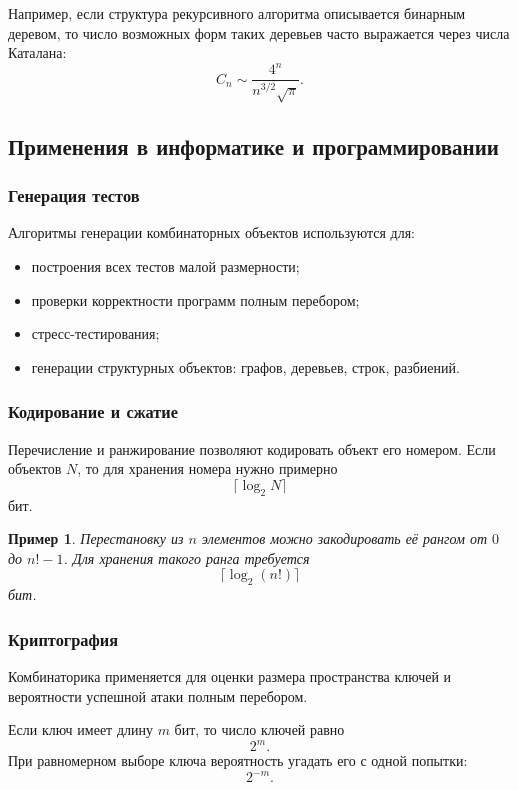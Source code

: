 \documentclass[12pt,a4paper]{article}
\newtheorem{example}{Пример}
\begin{document}
Например, если структура рекурсивного алгоритма описывается бинарным деревом, то число возможных форм таких деревьев часто выражается через числа Каталана:
\[
C_n\sim \frac{4^n}{n^{3/2}\sqrt{\pi}}.
\]

\subsection{Применения в информатике и программировании}

\subsubsection{Генерация тестов}

Алгоритмы генерации комбинаторных объектов используются для:
\begin{itemize}
    \item построения всех тестов малой размерности;
    \item проверки корректности программ полным перебором;
    \item стресс-тестирования;
    \item генерации структурных объектов: графов, деревьев, строк, разбиений.
\end{itemize}

\subsubsection{Кодирование и сжатие}

Перечисление и ранжирование позволяют кодировать объект его номером. Если объектов $N$, то для хранения номера нужно примерно
\[
\lceil \log_2 N\rceil
\]
бит.

\begin{example}
Перестановку из $n$ элементов можно закодировать её рангом от $0$ до $n!-1$. Для хранения такого ранга требуется
\[
\lceil \log_2(n!)\rceil
\]
бит.
\end{example}

\subsubsection{Криптография}

Комбинаторика применяется для оценки размера пространства ключей и вероятности успешной атаки полным перебором.

Если ключ имеет длину $m$ бит, то число ключей равно
\[
2^m.
\]
При равномерном выборе ключа вероятность угадать его с одной попытки:
\[
2^{-m}.
\]
\end{document}
